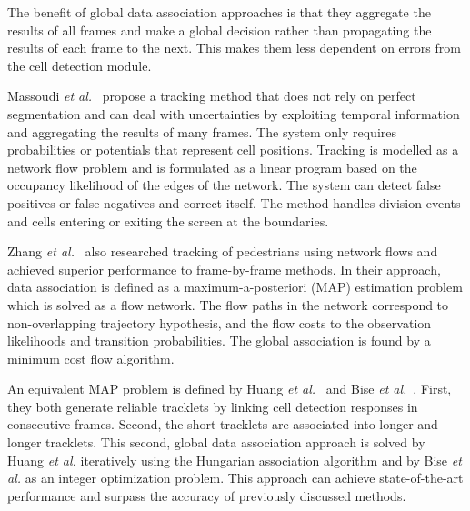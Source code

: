 The benefit of global data association approaches is that they aggregate the results of all frames and make a global decision rather than propagating the results of each frame to the next. This makes them less dependent on errors from the cell detection module.

Massoudi \emph{et al.}~\cite{massoudi12} propose a tracking method that does not rely on perfect segmentation and can deal with uncertainties by exploiting temporal information and aggregating the results of many frames. The system only requires probabilities or potentials that represent cell positions. Tracking is modelled as a network flow problem and is formulated as a linear program based on the occupancy likelihood of the edges of the network. The system can detect false positives or false negatives and correct itself. The method handles division events and cells entering or exiting the screen at the boundaries.

Zhang \emph{et al.}~\cite{zhang08} also researched tracking of pedestrians using network flows and achieved superior performance to frame-by-frame methods. In their approach, data association is defined as a maximum-a-posteriori (MAP) estimation problem which is solved as a flow network. The flow paths in the network correspond to non-overlapping trajectory hypothesis, and the flow costs to the observation likelihoods and transition probabilities. The global association is found by a minimum cost flow algorithm.

An equivalent MAP problem is defined by Huang \emph{et al.}~\cite{huang08} and Bise \emph{et al.}~\cite{bise11global}. First, they both generate reliable tracklets by linking cell detection responses in consecutive frames. Second, the short tracklets are associated into longer and longer tracklets. This second, global data association approach is solved by Huang \emph{et al.} iteratively using the Hungarian association algorithm \cite{kuhn55} and by Bise \emph{et al.} as an integer optimization problem. This approach can achieve state-of-the-art performance and surpass the accuracy of previously discussed methods.

